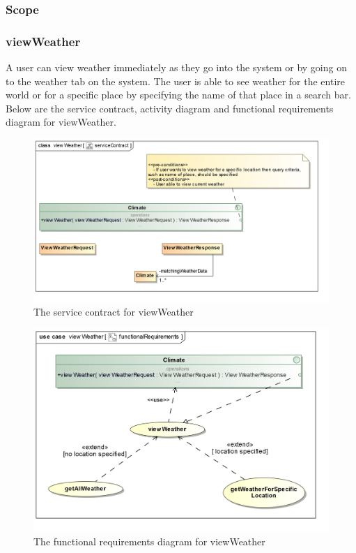 \subsubsection{Scope}


\subsubsection{viewWeather}

A user can view weather immediately as they go into the system or by going on to the weather tab on the system. The user is able to see weather for the entire world or for a specific place by specifying the name of that place in a search bar. Below are the service contract, activity diagram and functional requirements diagram for viewWeather.

\begin{figure}[H]
	\centering
	\includegraphics[scale=0.25]{../images/funcReq/viewWeatherServiceContract.jpg}
	\caption{The service contract for viewWeather \label{overflow}}
\end{figure}

\begin{figure}[H]
	\centering
	\includegraphics[width=1.0\textwidth]{../images/funcReq/viewWeatherFunctionalRequirements.jpg}
	\caption{The functional requirements diagram for viewWeather \label{overflow}}
\end{figure}

